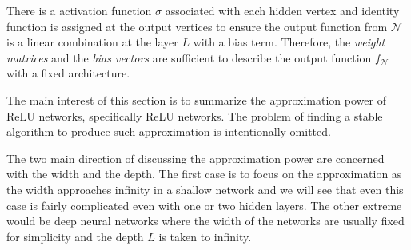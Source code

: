 There is a activation function $\sigma$ associated with each hidden vertex and
identity function is assigned at the output vertices to ensure the output
function from $\mathcal{N}$ is a linear combination at the layer $L$ with a bias
term. Therefore, the \textit{weight matrices} and the \textit{bias vectors} are
sufficient to describe the output function $f_{\mathcal{N}}$ with a fixed
architecture.

The main interest of this section is to summarize the approximation power of
ReLU networks, specifically ReLU networks. The problem of finding a stable
algorithm to produce such approximation is intentionally omitted.

The two main direction of discussing the approximation power are concerned with
the width and the depth. The first case is to focus on the approximation as the
width approaches infinity in a shallow network and we will see that even this
case is fairly complicated even with one or two hidden layers. The other extreme
would be deep neural networks where the width of the networks are usually fixed
for simplicity and the depth $L$ is taken to infinity. 

